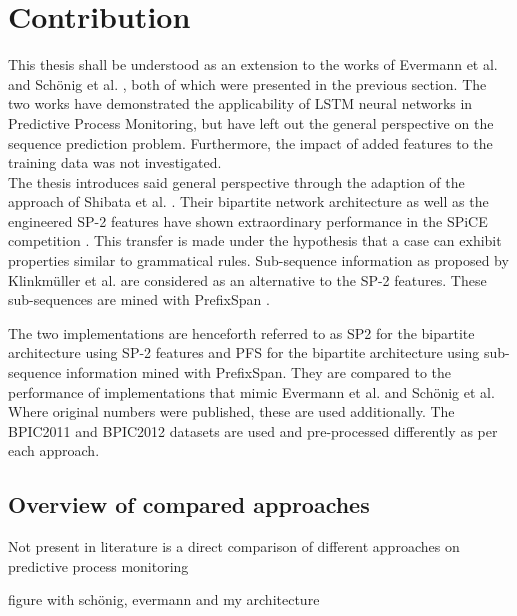 \chapter{Contribution}\label{sec:contribution}

This thesis shall be understood as an extension to the works of Evermann et al. \cite{evermann2016} and Schönig et al. \cite{schoenig2018}, both of which were presented in the previous section. The two works have demonstrated the applicability of LSTM neural networks in Predictive Process Monitoring, but have left out the general perspective on the sequence prediction problem. Furthermore, the impact of added features to the training data was not investigated.\\

The thesis introduces said general perspective through the adaption of the approach of Shibata et al. \cite{shibata2016bipartite}. Their bipartite network architecture as well as the engineered SP-2 features have shown extraordinary performance in the SPiCE competition \cite{web:spice}. This transfer is made under the hypothesis that a case can exhibit properties similar to grammatical rules. Sub-sequence information as proposed by Klinkmüller et al. \cite{klinkmuller2018reliablemonitoring} are considered as an alternative to the SP-2 features. These sub-sequences are mined with PrefixSpan \cite{pei2001prefixspan}.

The two implementations are henceforth referred to as SP2 for the bipartite architecture using SP-2 features and PFS for the bipartite architecture using sub-sequence information mined with PrefixSpan. They are compared to the performance of implementations that mimic Evermann et al. and Schönig et al. Where original numbers were published, these are used additionally. The BPIC2011 \cite{BPIC2011} and BPIC2012 \cite{BPIC2012} datasets are used and pre-processed differently as per each approach.\\

\section{Overview of compared approaches}
Not present in literature is a direct comparison of different approaches on predictive process monitoring

figure with schönig, evermann and my architecture

